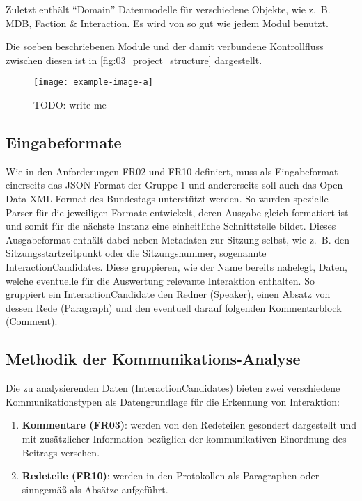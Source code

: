 Zuletzt enthält \enquote{Domain} Datenmodelle für verschiedene Objekte, wie z.~B. MDB,
Faction \& Interaction. Es wird von so gut wie jedem Modul benutzt.

Die soeben beschriebenen Module und der damit verbundene Kontrollfluss zwischen
diesen ist in \autoref{fig:03_project_structure} dargestellt.

\begin{figure}
    \begin{center}
        \texttt{[image: example-image-a]}
    \end{center}
    \caption{TODO: write me}
    \label{fig:03_project_structure}
\end{figure}

\subsection{Eingabeformate}
Wie in den Anforderungen FR02 und FR10 definiert, muss als Eingabeformat
einerseits das JSON Format der Gruppe 1 und andererseits soll auch das
Open Data XML Format des Bundestags unterstützt werden. So wurden
spezielle Parser für die jeweiligen Formate entwickelt, deren Ausgabe gleich
formatiert ist und somit für die nächste Instanz eine einheitliche
Schnittstelle bildet. Dieses Ausgabeformat enthält dabei neben Metadaten zur
Sitzung selbst, wie z.~B. den Sitzungsstartzeitpunkt oder die Sitzungsnummer,
sogenannte InteractionCandidates. Diese gruppieren, wie der Name bereits
nahelegt, Daten, welche eventuelle für die Auswertung relevante Interaktion
enthalten. So gruppiert ein InteractionCandidate den Redner (Speaker),
einen Absatz von dessen Rede (Paragraph) und den eventuell darauf folgenden
Kommentarblock (Comment).

\subsection{Methodik der Kommunikations-Analyse}
Die zu analysierenden Daten (InteractionCandidates) bieten zwei verschiedene
Kommunikationstypen als Datengrundlage für die Erkennung von Interaktion:

\begin{enumerate}
    \item \textbf{Kommentare (FR03)}: werden von den Redeteilen gesondert
        dargestellt und mit zusätzlicher Information bezüglich der
        kommunikativen Einordnung des Beitrags versehen.
    \item \textbf{Redeteile (FR10)}: werden in den Protokollen als
        Paragraphen oder sinngemäß als Absätze aufgeführt.
\end{enumerate}

